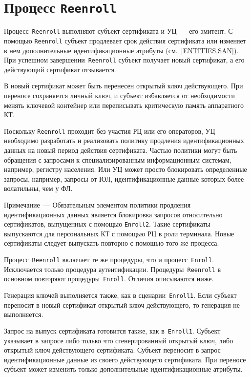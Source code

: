 \section{Процесс \texttt{Reenroll}}\label{PROCESSES.Reenroll}

Процесс~\texttt{Reenroll} выполняют субъект сертификата и УЦ~--- его 
эмитент. С помощью \texttt{Reenroll} субъект продлевает 
срок действия сертификата или изменяет в нем дополнительные
идентификационные атрибуты (см.~\ref{ENTITIES.SAN}).
%
При успешном завершении~\texttt{Reenroll} субъект получает новый 
сертификат, а его действующий сертификат отзывается. 

В новый сертификат может быть перенесен открытый ключ
действующего. При переносе сохраняется личный ключ,
и субъект избавляется от необходимости менять ключевой
контейнер или переписывать критическую память аппаратного КТ.

Поскольку \texttt{Reenroll} проходит без участия РЦ или его операторов,
УЦ необходимо разработать и реализовать политику продления 
идентификационных данных на новый период действия сертификата.
%
Частью политики могут быть обращения с запросами к специализированным 
информационным системам, например, регистру населения.
%
Или УЦ может просто блокировать определенные запросы, например, запросы от 
ЮЛ, идентификационные данные которых более волатильны, чем у ФЛ.

\begin{note}
Примечание~---
Обязательным элементом политики продления идентификационных данных
является блокировка запросов относительно сертификатов, выпущенных с 
помощью \texttt{Enroll2}. Такие сертификаты выпускаются для персональных 
КТ с помощью РЦ в роли терминала. Новые сертификаты следует выпускать 
повторно с помощью того же процесса.
\end{note}

Процесс~\texttt{Reenroll} включает те же процедуры, 
что и процесс~\texttt{Enroll}. Исключается только процедура 
аутентификации. Процедуры~\texttt{Reenroll} в основном повторяют 
процедуры~\texttt{Enroll}. Отличия описываются ниже.

Генерация ключей выполняется также, как в сценарии~\texttt{Enroll1}. 
Если субъект переносит в новый сертификат открытый ключ действующего, то 
генерация не выполняется. 

Запрос на выпуск сертификата готовится также, как в~\texttt{Enroll1}.
%
Субъект указывает в запросе либо только что сгенерированный открытый ключ,
либо открытый ключ действующего сертификата.
%
Субъект переносит в запрос идентификационные данные из своего действующего 
сертификата. При переносе субъект может изменить только дополнительные 
идентификационные атрибуты. 

